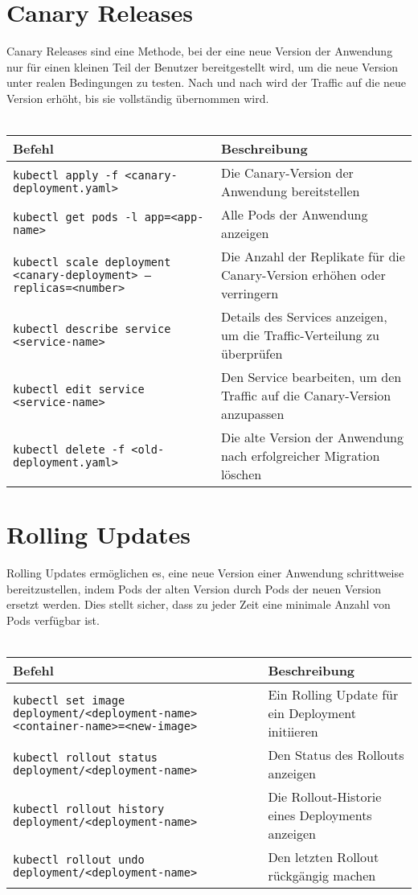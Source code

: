 \section{Canary Releases}
Canary Releases sind eine Methode, bei der eine neue Version der Anwendung nur für einen kleinen Teil der Benutzer bereitgestellt wird, um die neue Version unter realen Bedingungen zu testen. Nach und nach wird der Traffic auf die neue Version erhöht, bis sie vollständig übernommen wird.\\
\phantom{.}\\
\begin{tabular}{|p{}|p{}|}
\hline
\textbf{Befehl} & \textbf{Beschreibung} \\
\hline
\texttt{kubectl apply -f <canary-deployment.yaml>} & Die Canary-Version der Anwendung bereitstellen \\
\texttt{kubectl get pods -l app=<app-name>} & Alle Pods der Anwendung anzeigen \\
\texttt{kubectl scale deployment <canary-deployment> --replicas=<number>} & Die Anzahl der Replikate für die Canary-Version erhöhen oder verringern \\
\texttt{kubectl describe service <service-name>} & Details des Services anzeigen, um die Traffic-Verteilung zu überprüfen \\
\texttt{kubectl edit service <service-name>} & Den Service bearbeiten, um den Traffic auf die Canary-Version anzupassen \\
\texttt{kubectl delete -f <old-deployment.yaml>} & Die alte Version der Anwendung nach erfolgreicher Migration löschen \\
\hline
\end{tabular}

\section{Rolling Updates}
Rolling Updates ermöglichen es, eine neue Version einer Anwendung schrittweise bereitzustellen, indem Pods der alten Version durch Pods der neuen Version ersetzt werden. Dies stellt sicher, dass zu jeder Zeit eine minimale Anzahl von Pods verfügbar ist.\\
\phantom{.}\\
\begin{tabular}{|p{}|p{}|}
\hline
\textbf{Befehl} & \textbf{Beschreibung} \\
\hline
\texttt{kubectl set image deployment/<deployment-name> <container-name>=<new-image>} & Ein Rolling Update für ein Deployment initiieren \\
\texttt{kubectl rollout status deployment/<deployment-name>} & Den Status des Rollouts anzeigen \\
\texttt{kubectl rollout history deployment/<deployment-name>} & Die Rollout-Historie eines Deployments anzeigen \\
\texttt{kubectl rollout undo deployment/<deployment-name>} & Den letzten Rollout rückgängig machen \\
\hline
\end{tabular}
\newpage
